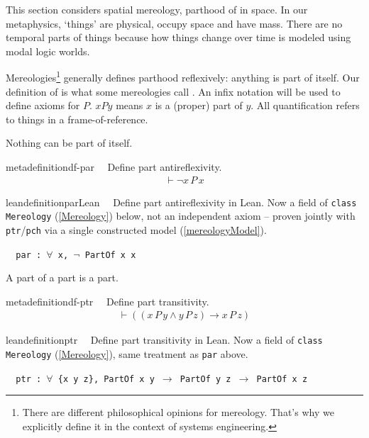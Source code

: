 \pn This section considers spatial mereology, parthood of  in space.  In our metaphysics, `things' are physical, occupy space and have mass.  There are no temporal parts of things because how things change over time is modeled using modal logic worlds.


\pn Mereologies\footnote{There are different philosophical opinions for mereology.  That's why we explicitly define it in the context of systems engineering.} generally defines parthood reflexively:  anything is part of itself.  Our definition of  is what some mereologies call .
An infix notation will be used to define axioms for $P$.  $xPy$ means $x$ is a (proper) part of $y$.  All quantification refers to things in a frame-of-reference.

\pn Nothing can be part of itself.
\begin{restatable}{metadefinition}{df-par}~~ Define part antireflexivity.
\begin{align}
\vdash \lnot x \,P \,x\label{eq:df-par}\tag{df-par}
\end{align}
\end{restatable}

\begin{restatable}{leandefinition}{parLean}~~ Define part antireflexivity in Lean. Now a
field of \texttt{class Mereology} (\ref{Mereology}) below, not an independent axiom -- proven jointly with
\texttt{ptr}/\texttt{pch} via a single constructed model (\ref{mereologyModel}).

\texttt{~~par : $\forall$ x, $\lnot$ PartOf x x}
\label{par}
\end{restatable}

\pn A part of a part is a part.
\begin{restatable}{metadefinition}{df-ptr}~~ Define part transitivity.
\begin{align}
\vdash ( ( x \,P \,y \wedge y \,P \,z ) \rightarrow x \,P \,z
    )\label{eq:df-ptr}\tag{df-ptr}
\end{align}
\end{restatable}

\begin{restatable}{leandefinition}{ptr}~~ Define part transitivity in Lean. Now a field of
\texttt{class Mereology} (\ref{Mereology}), same treatment as \texttt{par} above.

\texttt{~~ptr : $\forall$ \{x y z\}, PartOf x y $\to$ PartOf y z $\to$ PartOf x z}
\label{ptr}
\end{restatable}

